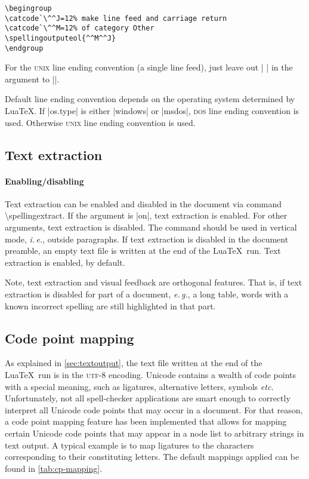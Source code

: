 \documentclass[11pt]{article}
\newcommand*{\acr}[1]{\mbox{\scshape#1}}
\newcommand*{\cmd}[1]{\mbox{\ttfamily\textbackslash#1}}
\newcommand*{\macro}[1]{\cmd{#1}\marginpar{\cmd{#1}}}
\newcommand*{\latinphrase}[1]{\foreignlanguage{latin}{\emph{#1}}}
\newcommand*{\lpeg}{\latinphrase{e.\,g.}\xspace}
\newcommand*{\lpetc}{\latinphrase{etc.}\xspace}
\newcommand*{\lpie}{\latinphrase{i.\,e.}\xspace}
\begin{document}
\begin{lstlisting}[language={[LaTeX]TeX}]
\begingroup
\catcode`\^^J=12% make line feed and carriage return
\catcode`\^^M=12% of category Other
\spellingoutputeol{^^M^^J}
\endgroup
\end{lstlisting}
%
For the \acr{unix} line ending convention (a single line feed), just
leave out |^^M| in the argument to |\spellingoutputeol|.

Default line ending convention depends on the operating system
determined by Lua\TeX.  If |os.type| is either |windows| or |msdos|,
\acr{dos} line ending convention is used.  Otherwise \acr{unix} line
ending convention is used.


\subsection{Text extraction}
\label{sec:textextraction}

\paragraph{Enabling/disabling} Text extraction can be enabled and
disabled in the document via command \macro{spellingextract}.  If the
argument is |on|, text extraction is enabled.  For other arguments, text
extraction is disabled.  The command should be used in vertical mode,
\lpie, outside paragraphs.  If text extraction is disabled in the
document preamble, an empty text file is written at the end of the
Lua\TeX\ run.  Text extraction is enabled, by default.

Note, text extraction and visual feedback are orthogonal features.  That
is, if text extraction is disabled for part of a document, \lpeg, a long
table, words with a known incorrect spelling are still highlighted in
that part.


\subsection{Code point mapping}
\label{sec:cp-mapping}

As explained in \autoref{sec:textoutput}, the text file written at the
end of the Lua\TeX\ run is in the \acr{utf-8} encoding.  Unicode
contains a wealth of code points with a special meaning, such as
ligatures, alternative letters, symbols \lpetc Unfortunately, not all
spell-checker applications are smart enough to correctly interpret all
Unicode code points that may occur in a document.  For that reason, a
code point mapping feature has been implemented that allows for mapping
certain Unicode code points that may appear in a node list to arbitrary
strings in text output.  A typical example is to map ligatures to the
characters corresponding to their constituting letters.  The default
mappings applied can be found in \autoref{tab:cp-mapping}.
\end{document}
